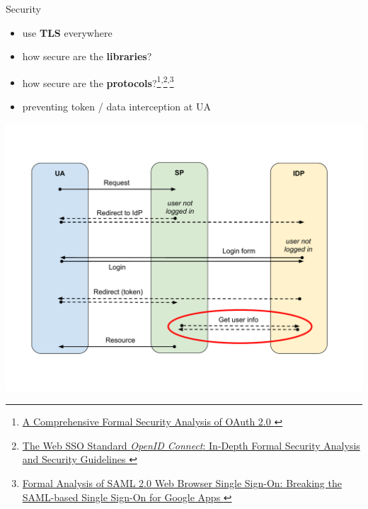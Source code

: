 \documentclass[ignorenonframetext,aspectratio=169]{beamer}
\providecommand{\tightlist}{%
  \setlength{\itemsep}{0pt}\setlength{\parskip}{0pt}}
\begin{document}
\begin{frame}{Security}
\begin{itemize}
\tightlist
\item use {\bf TLS} everywhere
\item how secure are the {\bf libraries}?
\item how secure are the {\bf
    protocols}?\footnote{
        \href{https://arxiv.org/pdf/1601.01229v2.pdf}{
            A Comprehensive Formal Security Analysis of OAuth 2.0
        }
    }\textsuperscript{,}\footnote{
        \href{https://arxiv.org/pdf/1704.08539.pdf}{
            The Web SSO Standard {\em OpenID Connect}:
            In-Depth Formal Security Analysis and Security Guidelines
        }
    }\textsuperscript{,}\footnote{
        \href{https://ai-lab.it/armando/pub/fmse9-armando.pdf}{
            Formal Analysis of SAML 2.0 Web Browser Single Sign-On:
            Breaking the SAML-based Single Sign-On for Google Apps
        }
    }
\item preventing token / data interception at UA
\end{itemize}
\end{frame}

\begin{frame}[plain]
\centering
\includegraphics[height=\paperheight]{fedsso-proto-6-getuserinfo.pdf}
\end{frame}
\end{document}
